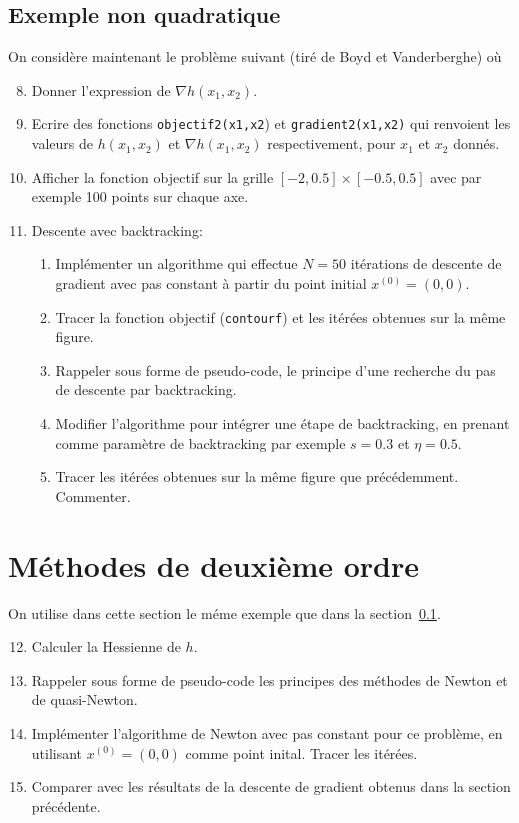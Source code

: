 \documentclass{article}
\begin{document}
\subsection{Exemple non quadratique}
\label{sec:non-quad}

On considère maintenant le problème suivant (tiré de Boyd et Vanderberghe)
où

\begin{enumerate}	
	\setcounter{enumi}{7}
	\item Donner l'expression de $\nabla h(x_1,x_2)$.
	\item Ecrire des fonctions \texttt{objectif2(x1,x2}) et \texttt{gradient2(x1,x2)} qui renvoient les valeurs de $h(x_1,x_2)$ et $\nabla h(x_1,x_2)$ respectivement, pour $x_1$ et $x_2$ donnés.
	\item Afficher la fonction objectif sur la grille $[-2,0.5]\times[-0.5,0.5]$ avec par exemple 100 points sur chaque axe.
	\item Descente avec backtracking:
	\begin{enumerate}
		\item Implémenter un algorithme qui effectue $N=50$ itérations de descente de gradient avec pas constant à partir du point initial $x^{(0)} = (0,0)$.
		\item Tracer la fonction objectif (\texttt{contourf}) et les itérées obtenues sur la même figure.
		\item Rappeler sous forme de pseudo-code, le principe d'une recherche du pas de descente par backtracking.
		\item Modifier l'algorithme pour intégrer une étape de backtracking, en prenant comme paramètre de backtracking par exemple $s=0.3$ et $\eta = 0.5$.
		\item Tracer les itérées obtenues sur la même figure que précédemment. Commenter.
		
	\end{enumerate}
\end{enumerate}

\section{Méthodes de deuxième ordre}

On utilise dans cette section le méme exemple que dans la section~\ref{sec:non-quad}.
\begin{enumerate}
	\setcounter{enumi}{11}
	\item Calculer la Hessienne de $h$.
	\item Rappeler sous forme de pseudo-code les principes des méthodes de Newton et de quasi-Newton.
	\item Implémenter l'algorithme de Newton avec pas constant pour ce problème, en utilisant $x^{(0)} = (0,0)$ comme point inital. Tracer les itérées.
	\item Comparer avec les résultats de la descente de gradient obtenus dans la section précédente.
\end{enumerate}
\end{document}
